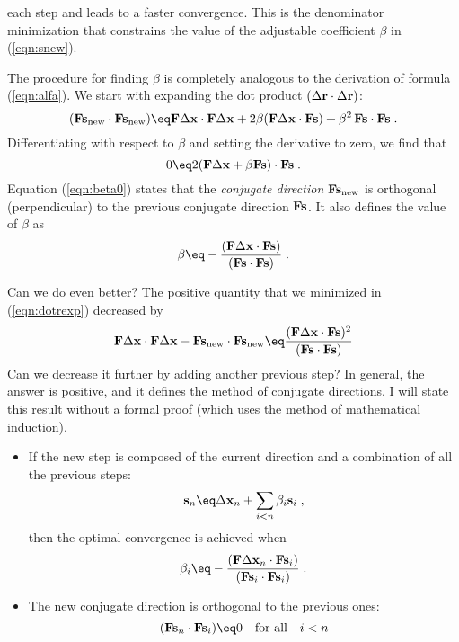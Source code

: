each step and leads to a faster convergence. This is the denominator
minimization that constrains the value of the adjustable coefficient
$\beta$ in (\ref{eqn:snew}).
\par
The procedure for finding $\beta$ is completely analogous to the
derivation of formula (\ref{eqn:alfa}). We start with expanding the
dot product $(\Delta \bold r \cdot \Delta \bold r)$:
\begin{equation}
  \label{eqn:dotrexp}
  (\bold F \bold s_{\rm new} \cdot \bold F \bold s_{\rm new}) \eq
  \bold F \Delta \bold x \cdot \bold F \Delta \bold x +
  2 \beta (\bold F \Delta \bold x \cdot \bold F \bold s) +
  \beta^2\,\bold F \bold s \cdot \bold F \bold s\;.
\end{equation}
Differentiating with respect to $\beta$ and setting the derivative to
zero,
we find that
\begin{equation}
  \label{eqn:beta0}
  0 \eq 2 (\bold F \Delta \bold x + \beta \bold F \bold s) 
  \cdot \bold F \bold s\;.
\end{equation}
Equation (\ref{eqn:beta0}) states that the \emph{conjugate direction}
$\bold F \bold s_{\rm new}$ is orthogonal (perpendicular) to the
previous conjugate direction $\bold F \bold s$. It also defines the
value of $\beta$ as
\begin{equation}
  \label{eqn:beta}
  \beta \eq - \frac{ (\bold F \Delta \bold x \cdot \bold F \bold s )}
  {(\bold F \bold s \cdot \bold F \bold s )}\;.
\end{equation}
\par
Can we do even better? The positive quantity that we minimized in
(\ref{eqn:dotrexp}) decreased by
\begin{equation}
  \label{eqn:sdecr}
  \bold F \Delta \bold x \cdot \bold F \Delta \bold x -
  \bold F \bold s_{\rm new} \cdot \bold F \bold s_{\rm new} \eq
  \frac{ (\bold F \Delta \bold x \cdot \bold F \bold s )^2}
  {(\bold F \bold s \cdot \bold F \bold s )}
\end{equation}
Can we decrease it further by adding another previous step? In
general, the answer is positive, and it defines the method of
conjugate directions. I will state this result without a formal proof
(which uses the method of mathematical induction). 
\begin{itemize}
\item If the new step is
composed of the current direction and a combination of all the
previous steps:
\begin{equation}
  \label{eqn:sn}
  \bold s_n \eq \Delta \bold x_n + \sum_{i < n} \beta_i \bold s_i\;, 
\end{equation}
then the optimal convergence is achieved when
\begin{equation}
  \label{eqn:betai}
  \beta_i \eq - \frac{ (\bold F \Delta \bold x_n \cdot \bold F \bold s_i )}
  {(\bold F \bold s_i \cdot \bold F \bold s_i )}\;.
\end{equation}
\item The new conjugate direction is orthogonal to the previous ones:
  \begin{equation}
    \label{eqn:cdortho}
    (\bold F \bold s_n \cdot \bold F \bold s_i) \eq 0 
    \quad \mbox{for all} \quad i < n
  \end{equation}
\end{itemize}

